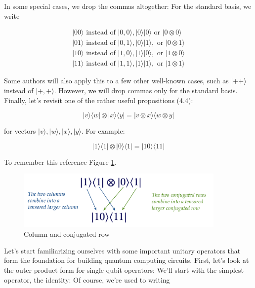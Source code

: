 \documentclass[main.tex]{subfiles}
\begin{document}
    In some special cases, we drop the commas altogether: For the standard basis, we write
    
    \begin{align*}
        |00\rangle \text{ instead of } |0,0\rangle,|0\rangle|0\rangle \text{ or } |0 \otimes 0\rangle \\
        |01\rangle \text{ instead of } |0,1\rangle,|0\rangle|1\rangle, \text{ or } |0 \otimes 1\rangle \\
        |10\rangle \text{ instead of } |1,0\rangle,|1\rangle|0\rangle, \text{ or } |1 \otimes 0\rangle \\
        |11\rangle \text{ instead of } |1,1\rangle,|1\rangle|1\rangle, \text{ or } |1 \otimes 1\rangle 
    \end{align*}
    
    Some authors will also apply this to a few other well-known cases, such as $|++\rangle$ instead of $|+,+\rangle$. However, we will drop commas only for the standard basis. Finally, let's revisit one of the rather useful propositions (4.4):
    
    $$
    |v\rangle\langle w|\otimes| x\rangle\langle y|=| v \otimes x\rangle\langle w \otimes y|
    $$
    
    for vectors $|v\rangle,|w\rangle,|x\rangle,|y\rangle$. For example:
    
    $$
    |1\rangle\langle 1|\otimes| 0\rangle\langle 1|=| 10\rangle\langle 11|
    $$
    
    To remember this reference Figure \ref{fig:06tensor1}.
    
    \begin{figure}
        \centering
        \includegraphics[width=4in]{notes/figs/n06/07tensor3.png}
        \caption{Column and conjugated row}
        \label{fig:06tensor1}
    \end{figure}
    
    Let's start familiarizing ourselves with some important unitary operators that form the foundation for building quantum computing circuits. First, let's look at the outer-product form for single qubit operators: We'll start with the simplest operator, the identity: Of course, we're used to writing
    
\end{document}
